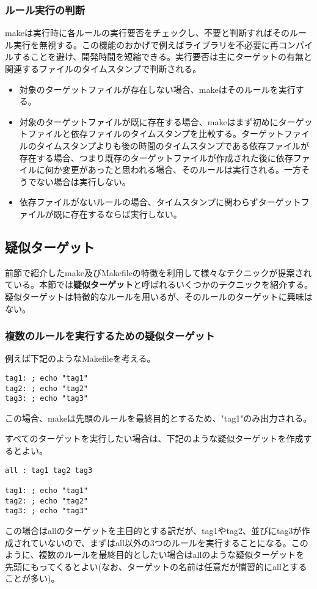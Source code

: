 \documentclass[dvipdfmx, 9pt, a4paper]{jsarticle}
\numberwithin{equation}{section}
\begin{document}
\subsubsection{ルール実行の判断}
makeは実行時に各ルールの実行要否をチェックし、不要と判断すればそのルール実行を無視する。この機能のおかげで例えばライブラリを不必要に再コンパイルすることを避け、開発時間を短縮できる。実行要否は主にターゲットの有無と関連するファイルのタイムスタンプで判断される。\par
\begin{itemize}
\item 対象のターゲットファイルが存在しない場合、makeはそのルールを実行する。
\item 対象のターゲットファイルが既に存在する場合、makeはまず初めにターゲットファイルと依存ファイルのタイムスタンプを比較する。ターゲットファイルのタイムスタンプよりも後の時間のタイムスタンプである依存ファイルが存在する場合、つまり既存のターゲットファイルが作成された後に依存ファイルに何か変更があったと思われる場合、そのルールは実行される。一方そうでない場合は実行しない。
\item 依存ファイルがないルールの場合、タイムスタンプに関わらずターゲットファイルが既に存在するならば実行しない。
\end{itemize}

\subsection{疑似ターゲット}
前節で紹介したmake及びMakefileの特徴を利用して様々なテクニックが提案されている。本節では{\bf 疑似ターゲット}と呼ばれるいくつかのテクニックを紹介する。疑似ターゲットは特徴的なルールを用いるが、そのルールのターゲットに興味はない。
\subsubsection{複数のルールを実行するための疑似ターゲット}
例えば下記のようなMakefileを考える。
\begin{lstlisting}[caption=複数のターゲットがあるMakefile3]
tag1: ; echo "tag1"
tag2: ; echo "tag2"
tag3: ; echo "tag3"
\end{lstlisting}\par
この場合、makeは先頭のルールを最終目的とするため、"tag1"のみ出力される。\par
すべてのターゲットを実行したい場合は、下記のような疑似ターゲットを作成するとよい。
\begin{lstlisting}[caption=疑似ターゲットall]
all : tag1 tag2 tag3

tag1: ; echo "tag1"
tag2: ; echo "tag2"
tag3: ; echo "tag3"
\end{lstlisting}\par
この場合はallのターゲットを主目的とする訳だが、tag1やtag2、並びにtag3が作成されていないので、まずはall以外の3つのルールを実行することになる。このように、複数のルールを最終目的としたい場合はallのような疑似ターゲットを先頭にもってくるとよい(なお、ターゲットの名前は任意だが慣習的にallとすることが多い)。
\end{document}
